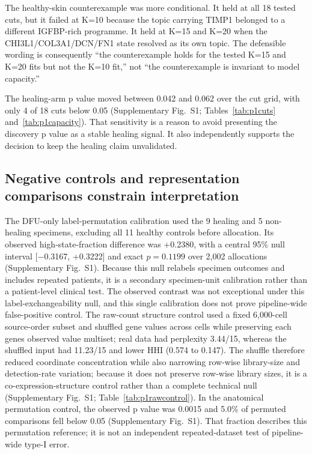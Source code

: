 \documentclass[10pt,a4paper]{article}
\begin{document}
The healthy-skin counterexample was more conditional. It held at all 18 tested cuts, but it failed at K=10 because the topic carrying TIMP1 belonged to a different IGFBP-rich programme. It held at K=15 and K=20 when the CHI3L1/COL3A1/DCN/FN1 state resolved as its own topic. The defensible wording is consequently ``the counterexample holds for the tested K=15 and K=20 fits but not the K=10 fit,'' not ``the counterexample is invariant to model capacity.''

The healing-arm p value moved between 0.042 and 0.062 over the cut grid, with only 4 of 18 cuts below 0.05 (Supplementary Fig.~S1; Tables~\ref{tab:p1cuts} and~\ref{tab:p1capacity}). That sensitivity is a reason to avoid presenting the discovery p value as a stable healing signal. It also independently supports the decision to keep the healing claim unvalidated.

\subsection{Negative controls and representation comparisons constrain interpretation}

The DFU-only label-permutation calibration used the 9 healing and 5 non-healing specimens, excluding all 11 healthy controls before allocation. Its observed high-state-fraction difference was +0.2380, with a central 95\% null interval {[}−0.3167, +0.3222{]} and exact $p=0.1199$ over 2,002 allocations (Supplementary Fig.~S1). Because this null relabels specimen outcomes and includes repeated patients, it is a secondary specimen-unit calibration rather than a patient-level clinical test. The observed contrast was not exceptional under this label-exchangeability null, and this single calibration does not prove pipeline-wide false-positive control. The raw-count structure control used a fixed 6,000-cell source-order subset and shuffled gene values across cells while preserving each gene\textquotesingle{}s observed value multiset; real data had perplexity 3.44/15, whereas the shuffled input had 11.23/15 and lower HHI (0.574 to 0.147). The shuffle therefore reduced coordinate concentration while also narrowing row-wise library-size and detection-rate variation; because it does not preserve row-wise library sizes, it is a co-expression-structure control rather than a complete technical null (Supplementary Fig.~S1; Table~\ref{tab:p1rawcontrol}). In the anatomical permutation control, the observed p value was 0.0015 and 5.0\% of permuted comparisons fell below 0.05 (Supplementary Fig.~S1). That fraction describes this permutation reference; it is not an independent repeated-dataset test of pipeline-wide type-I error.
\end{document}
